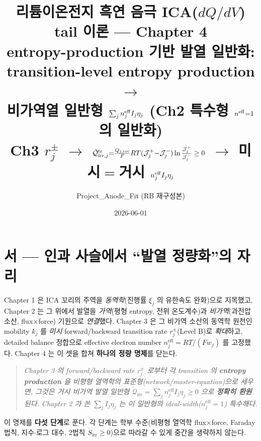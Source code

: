 \documentclass[11pt,a4paper]{article}
\title{\textbf{리튬이온전지 흑연 음극 ICA($dQ/dV$) tail 이론 — Chapter 4}\\[0.4em]
\large entropy-production 기반 발열 일반화: transition-level entropy production $\to$\\
비가역열 일반형 $\sum_j n_j^{\eff}I_j\eta_j$ (Ch2 특수형 $n^{\eff}{=}1$ 의 일반화)\\[0.2em]
\normalsize Ch3 $r_j^\pm$ $\to$ $\dot{\mathcal Q}_{\irr,j}^{\tr}{=}\tfrac{Q_{j,\tot}}{F}RT(\mathcal J_j^+{-}\mathcal J_j^-)\ln\tfrac{\mathcal J_j^+}{\mathcal J_j^-}\ge0$ $\to$ 미시$=$거시 $n_j^{\eff}I_j\eta_j$}
\author{Project\_Anode\_Fit (RB 재구성본)}
\date{2026-06-01}
\newcommand{\eff}{\mathrm{eff}}
\newcommand{\irr}{\mathrm{irr}}
\begin{document}
\sloppy
\maketitle

\section*{서 — 인과 사슬에서 ``발열 정량화''의 자리}
Chapter 1 은 ICA 꼬리의 주역을 \emph{동역학}(진행률 $\xi_j$ 의 유한속도 완화)으로 지목했고, Chapter 2 는 그
위에서 발열을 \emph{가역}(평형 entropy, 전위 온도계수)과 \emph{비가역}(과전압 소산, flux$\times$force) 기원으로
\emph{연결}했다. Chapter 3 은 그 비가역 소산의 동역학 원천인 mobility $k_j$ 를 \emph{미시} forward/backward
transition rate $r_j^\pm$(Level B)로 \emph{확대}하고, detailed balance 정합으로 effective electron number
$n_j^{\eff}=RT/(Fw_j)$ 를 고정했다. Chapter 4 는 이 셋을 합쳐 \textbf{하나의 정량 명제}를 닫는다.
\begin{quote}\itshape
Chapter 3 의 forward/backward rate $r_j^\pm$ 로부터 각 transition 의 \textbf{entropy production} 을 비평형
열역학의 표준형(network/master-equation)으로 세우면, 그것은 거시 비가역 발열 \emph{일반형}
$\dot{\mathcal Q}_\irr=\sum_j n_j^{\eff}I_j\eta_j\ge0$ 으로 \textbf{정확히 환원}된다. Chapter 2 가 쓴
$\sum_j I_j\eta_j$ 는 이 일반형의 ideal-width($n_j^{\eff}=1$) 특수해다.
\end{quote}
이 명제를 \textbf{다섯 단계}로 푼다. 각 단계는 학부 수준(비평형 열역학 flux$\times$force, Faraday 법칙,
지수$\cdot$로그 대수, 2법칙 $\dot S_\irr\ge0$)으로 따라갈 수 있게 중간을 생략하지 않는다.
\end{document}
